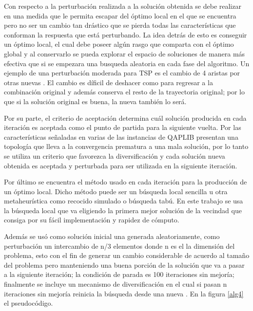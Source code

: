 \documentclass{ci5652}
\begin{document}
Con respecto a la perturbación realizada a la solución obtenida se debe realizar en una medida que le permita escapar del óptimo local en el que se encuentra pero no ser un cambio tan drástico que se pierda todas las características que conforman la respuesta que está perturbando. La idea detrás de esto es conseguir un óptimo local, el cual debe poseer algún rasgo que comparta con el óptimo global y al conservarlo se pueda explorar el espacio de soluciones de manera más efectiva que si se empezara una busqueda aleatoria en cada fase del algoritmo. Un ejemplo de una perturbación moderada para TSP es el cambio de 4 aristas por otras nuevas \cite{9}. El cambio es díficil de deshacer como para regresar a la combinación original y además conserva el resto de la trayectoria original; por lo que si la solución original es buena, la nueva también lo será.

Por su parte, el criterio de aceptación determina cuál solución producida en cada iteración es aceptada como el punto de partida para la siguiente vuelta. Por las características señaladas en \cite{14} varias de las instancias de QAPLIB presentan una topología que lleva a la convergencia prematura a una mala solución, por lo tanto se utiliza un criterio que favorezca la diversificación y cada solución nueva obtenida es aceptada y perturbada para ser utilizada en la siguiente iteración.

Por último se encuentra el método usado en cada iteración para la producción de un óptimo local. Dicho método puede ser un búsqueda local sencilla u otra metaheurística como recocido simulado o búsqueda tabú. En este trabajo se usa la búsqueda local que va eligiendo la primera mejor solución de la vecindad que consiga por su fácil implementación y rapidez de cómputo.

Además se usó como solución inicial una generada aleatoriamente, como perturbación un intercambio de n/3 elementos donde n es el la dimensión del problema, esto con el fin de generar un cambio considerable de acuerdo al tamaño del problema pero manteniendo una buena porción de la solución que va a pasar a la siguiente iteración; la condición de parada es 100 iteraciones sin mejoría; finalmente se incluye un mecanismo de diversificación en el cual si pasan n iteraciones sin mejoría reinicia la búsqueda desde una nueva . En la figura \ref{alg4} el pseudocódigo.
\end{document}
